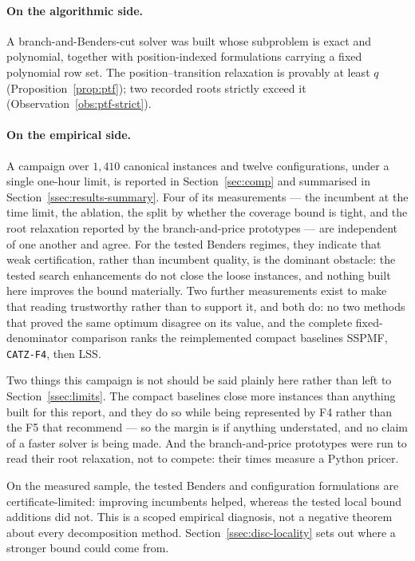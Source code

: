 \paragraph{On the algorithmic side.}
A branch-and-Benders-cut solver was built whose subproblem is exact and polynomial,
together with position-indexed formulations carrying a fixed polynomial row set. The
position--transition relaxation is provably at least $q$
(Proposition~\ref{prop:ptf}); two recorded roots strictly exceed it
(Observation~\ref{obs:ptf-strict}).

\paragraph{On the empirical side.}
A campaign over $1{,}410$ canonical instances and twelve configurations, under a single one-hour
limit, is reported in Section~\ref{sec:comp} and summarised in
Section~\ref{ssec:results-summary}. Four of its measurements --- the incumbent at the
time limit, the ablation, the split by whether the coverage bound is tight, and the
root relaxation reported by the branch-and-price prototypes --- are independent of one
another and agree. For the tested Benders regimes, they indicate that weak
certification, rather than incumbent quality, is the dominant obstacle: the tested
search enhancements do not close the loose instances, and nothing built here improves
the bound materially. Two further measurements exist to make that reading
trustworthy rather than to support it, and both do: no two methods that proved the same
optimum disagree on its value, and the complete fixed-denominator comparison ranks
the reimplemented compact baselines SSPMF, \texttt{CATZ-F4}, then LSS.

Two things this campaign is not should be said plainly here rather than left to
Section~\ref{ssec:limits}. The compact baselines close more instances than
anything built for this report, and they do so while being represented by F4 rather
than the F5 that \citet{Catanzaro2015} recommend --- so the margin is if anything
understated, and no claim of a faster solver is being made. And the branch-and-price
prototypes were run to read their root relaxation, not to compete: their times measure
a Python pricer.

On the measured sample, the tested Benders and configuration formulations are
certificate-limited: improving incumbents helped, whereas the tested local bound
additions did not. This is a scoped empirical diagnosis, not a negative theorem about
every decomposition method. Section~\ref{ssec:disc-locality} sets out where a stronger
bound could come from.

